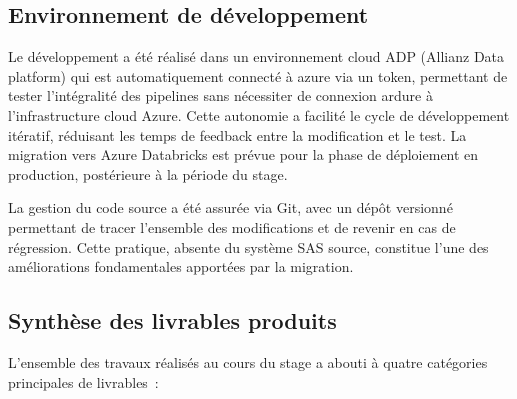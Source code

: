\subsection{Environnement de développement}

Le développement a été réalisé dans un environnement cloud ADP (Allianz Data platform) qui est automatiquement connecté à azure via un token, permettant de tester l'intégralité des pipelines sans nécessiter de connexion ardure à l'infrastructure cloud Azure. Cette autonomie a facilité le cycle de développement itératif, réduisant les temps de feedback entre la modification et le test. La migration vers Azure Databricks est prévue pour la phase de déploiement en production, postérieure à la période du stage.

La gestion du code source a été assurée via Git, avec un dépôt versionné permettant de tracer l'ensemble des modifications et de revenir en cas de régression. Cette pratique, absente du système SAS source, constitue l'une des améliorations fondamentales apportées par la migration.

\enlargethispage{2cm} %
\subsection{Synthèse des livrables produits}

L'ensemble des travaux réalisés au cours du stage a abouti à quatre catégories principales de livrables :

